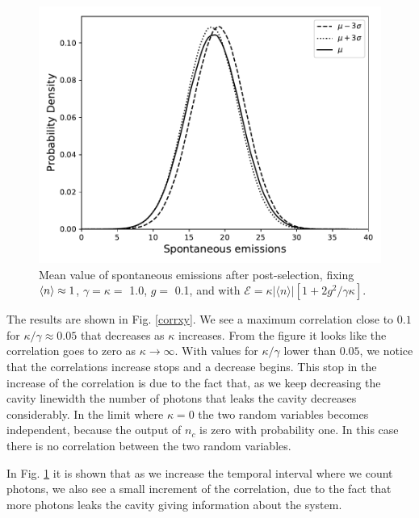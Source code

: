 \documentclass[%
 reprint,
 amsmath,amssymb,
 aps, 
]{revtex4-2}
\begin{document}
\begin{center}
\begin{figure}[h!]
\begin{center}
\includegraphics[scale = 0.5]{cnocorr1.pdf}
\caption{\small{Mean value of spontaneous emissions after post-selection, fixing $\expval{n} \approx 1$, $\gamma = \kappa =$ 1.0, $g =$ 0.1, and with  $\mathcal{E} =  \kappa |\langle n \rangle|[1 + 2g^2/\gamma \kappa]$.}}  \label{errorzz}
\end{center}
\end{figure}
\end{center}

The results are shown in Fig. \ref{corrxy}. We see a maximum
correlation close to $0.1$ for $\kappa/\gamma\approx 0.05$ that
decreases as $\kappa$ increases. From the figure it looks like the
correlation goes to zero as $\kappa\rightarrow\infty$. With values for
$\kappa/\gamma$ lower than $0.05$, we notice that the correlations
increase stops and a decrease begins. This stop in the increase of the
correlation is due to the fact that, as we keep decreasing the cavity
linewidth the number of photons that leaks the cavity decreases
considerably. In the limit where $\kappa=0$ the two random
variables becomes independent, because the output of $n_c$ is zero
with probability one. In this case there is no correlation between the two
random variables.





In Fig. \ref{errorzz} it is shown that as we increase the temporal
interval where we count photons, we also see a small increment of the
correlation, due to the fact that more photons leaks the cavity
giving information about the system.
\end{document}
